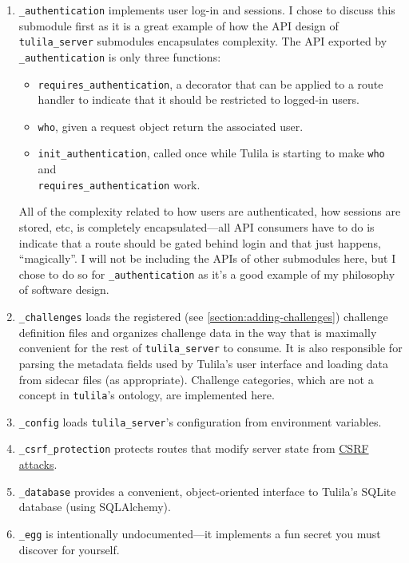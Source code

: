 \documentclass[12pt]{article}
\begin{document}
\begin{enumerate}
  \item \texttt{\_authentication} implements user log-in and sessions. I chose to discuss this submodule first as it is a great example of how the API design of \texttt{tulila\_server} submodules encapsulates complexity. The API exported by \texttt{\_authentication} is only three functions:
  \begin{itemize}[$\circ$]
    \item \texttt{requires\_authentication}, a decorator that can be applied to a route handler to indicate that it should be restricted to logged-in users.
    \item \texttt{who}, given a request object return the associated user.
    \item \texttt{init\_authentication}, called once while Tulila is starting to make \texttt{who} and \\\texttt{requires\_authentication} work.
  \end{itemize}
  All of the complexity related to how users are authenticated, how sessions are stored, etc, is completely encapsulated---all API consumers have to do is indicate that a route should be gated behind login and that just happens, ``magically''. I will not be including the APIs of other submodules here, but I chose to do so for \texttt{\_authentication} as it's a good example of my philosophy of software design.
  \item \texttt{\_challenges} loads the registered (see \cref{section:adding-challenges}) challenge definition files and organizes challenge data in the way that is maximally convenient for the rest of \texttt{tulila\_server} to consume. It is also responsible for parsing the metadata fields used by Tulila's user interface and loading data from sidecar files (as appropriate). Challenge categories, which are not a concept in \texttt{tulila}'s ontology, are implemented here.
  \item \texttt{\_config} loads \texttt{tulila\_server}'s configuration from environment variables.
  \item \texttt{\_csrf\_protection} protects routes that modify server state from \href{https://owasp.org/www-community/attacks/csrf}{CSRF attacks}.
  \item \texttt{\_database} provides a convenient, object-oriented interface to Tulila's SQLite database (using SQLAlchemy).
  \item \texttt{\_egg} is intentionally undocumented---it implements a fun secret you must discover for yourself.

\end{enumerate}
\end{document}
